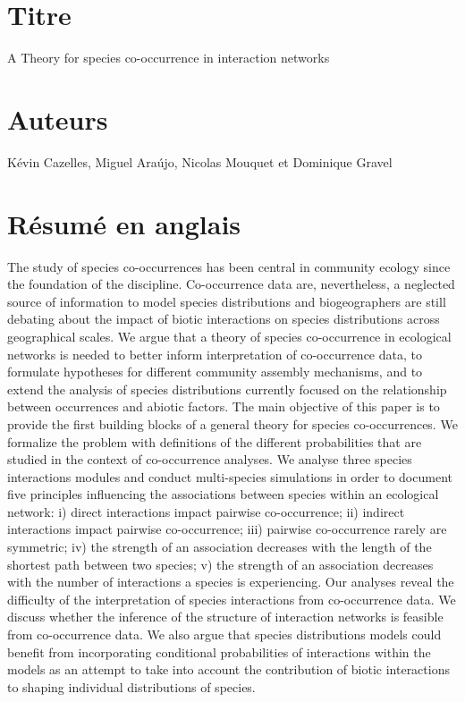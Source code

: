 \newpage

\section{Titre}

A Theory for species co-occurrence in interaction networks

\section{Auteurs}

Kévin Cazelles, Miguel Ara\'ujo, Nicolas Mouquet et Dominique Gravel

\section{Résumé en anglais}

The study of species co-occurrences has been central in community ecology since the foundation of the discipline. Co-occurrence data are, nevertheless, a neglected source of information to model species distributions and biogeographers are still debating about the impact of biotic interactions on species distributions across geographical scales. We argue that a theory of species co-occurrence in ecological networks is needed to better inform interpretation of co-occurrence data, to formulate hypotheses for different community assembly mechanisms, and to extend the analysis of species distributions currently focused on the relationship between occurrences and abiotic factors. The main objective of this paper is to provide the first building blocks of a general theory for species co-occurrences. We formalize the problem with definitions of the different probabilities that are studied in the context of co-occurrence analyses. We analyse three species interactions modules and conduct multi-species simulations in order to document five principles influencing the associations between  species within an ecological network: i) direct interactions impact pairwise co-occurrence; ii) indirect interactions impact pairwise co-occurrence; iii) pairwise co-occurrence rarely are symmetric; iv) the strength of an association decreases with the length of the shortest path between two species; v) the strength of an association decreases with the number of interactions a species is experiencing. Our analyses reveal the difficulty of the interpretation of species interactions from co-occurrence data. We discuss whether the inference of the structure of interaction networks is feasible from co-occurrence data. We also argue that species distributions models could benefit from incorporating conditional probabilities of interactions within the models as an attempt to take into account the contribution of biotic interactions to shaping individual distributions of species.

